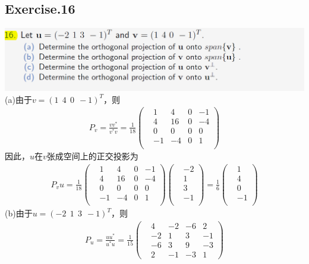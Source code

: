 \documentclass[UTF8,12pt, a4paper]{ctexart}
\begin{document}
\subsection*{Exercise.16}

\includegraphics[scale=0.8]{question16.png}\\
(a)由于$v=(1\ \ 4 \ \ 0 \ \ -1)^T$，则
\begin{align*}
  P_v = \frac{vv^*}{v^*v}= 
  \frac{1}{18}
  \left(
    \begin{matrix}
      &1 &4 &0 &-1 \\
      &4 &16 &0 &-4 \\
      &0 &0 &0 &0 \\
      &-1 &-4 &0 &1 \\
    \end{matrix}
  \right)
\end{align*}
因此，$u$在$v$张成空间上的正交投影为
\begin{align*}
    P_vu=\frac{1}{18}
    \left(
      \begin{matrix}
        &1 &4 &0 &-1 \\
        &4 &16 &0 &-4 \\
        &0 &0 &0 &0 \\
        &-1 &-4 &0 &1 \\
      \end{matrix}
    \right)
    \left(
      \begin{matrix}
        &-2 \\
        &1 \\
        &3 \\
        &-1 \\
      \end{matrix}
    \right)
    =\frac{1}{6}\left(
      \begin{matrix}
        &1 \\
        &4 \\
        &0 \\
        &-1 \\
      \end{matrix}
    \right)
\end{align*}
(b)由于$u=(-2\ \ 1 \ \ 3 \ \ -1)^T$，则
\begin{align*}
  P_u = \frac{uu^*}{u^*u}= 
  \frac{1}{15}
  \left(
    \begin{matrix}
      &4 &-2 &-6 &2 \\
      &-2 &1 &3 &-1 \\
      &-6 &3 &9 &-3 \\
      &2 &-1 &-3 &1 
    \end{matrix}
  \right)
\end{align*}
\end{document}
